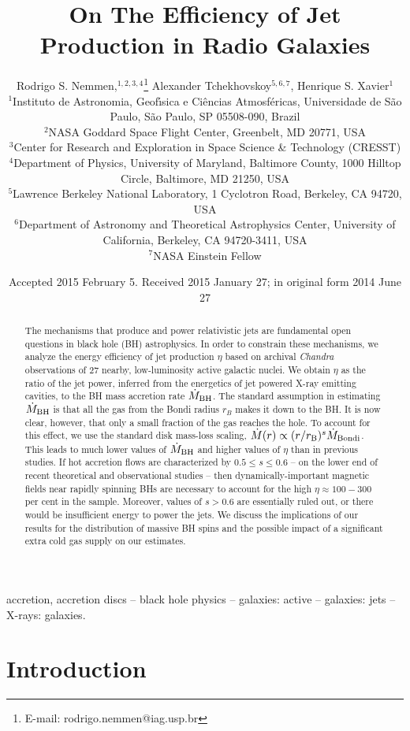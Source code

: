 \documentclass[useAMS,usenatbib]{mn2e}
\title[On the Efficiency of Jet Production in AGNs]{On The Efficiency of Jet Production in Radio Galaxies}
\author[Nemmen]{Rodrigo S. Nemmen,$^{1,2,3,4}$\thanks{E-mail: rodrigo.nemmen@iag.usp.br} Alexander Tchekhovskoy$^{5,6,7}$, 
  Henrique S. Xavier$^{1}$\\
$^{1}$Instituto de Astronomia, Geof\'{\i}sica e Ci\^encias Atmosf\'ericas, Universidade de S\~ao Paulo, S\~ao Paulo, SP 05508-090, Brazil \\
$^{2}$NASA Goddard Space Flight Center, Greenbelt, MD 20771, USA \\
$^{3}$Center for Research and Exploration in Space Science \& Technology (CRESST) \\
$^{4}$Department of Physics, University of Maryland, Baltimore County, 1000 Hilltop Circle, Baltimore, MD 21250, USA \\
$^5$Lawrence Berkeley National Laboratory, 1 Cyclotron Road, Berkeley, CA 94720, USA \\$^6$Department of Astronomy and Theoretical Astrophysics Center, University of California, Berkeley, CA 94720-3411, USA \\
$^7$NASA Einstein Fellow \\
}
\begin{document}
\date{Accepted 2015 February 5. Received 2015 January 27; in original form 2014 June 27}

\pagerange{\pageref{firstpage}--\pageref{lastpage}} 

\maketitle

\label{firstpage}

\begin{abstract}
The mechanisms that produce and power relativistic jets are fundamental open questions in black hole (BH) astrophysics. In order to constrain these mechanisms, we analyze the energy efficiency of jet production $\eta$ based on archival \emph{Chandra} observations of 27 nearby, low-luminosity active galactic nuclei. We obtain $\eta$ as the ratio of the jet power, inferred from the energetics of jet powered X-ray emitting cavities, to the BH mass accretion rate $\dot{M}_{\rm BH}$. The standard assumption in estimating $\dot{M}_{\rm BH}$ is that all the gas from the Bondi radius $r_B$ makes it down to the BH. It is now clear, however, that only a small fraction of the gas reaches the hole. To account for this effect, 
we use the standard disk mass-loss scaling, $\dot{M}(r) \propto (r/r_{\rm B})^s \dot M_{\rm Bondi}$. 
This leads to much lower values of $\dot M_{\rm BH}$ and higher values of $\eta$ than in previous studies. If hot accretion flows are characterized by $0.5 \leq s \leq 0.6$ -- on the lower end of recent theoretical and observational studies -- then dynamically-important magnetic fields near rapidly spinning BHs are necessary to account for the high $\eta \approx 100-300$ per cent in the sample. Moreover, values of $s>0.6$ are essentially ruled out, or there would be insufficient energy to power the jets. 
We discuss the implications of our results for the distribution of massive BH spins and the possible impact of a significant extra cold gas supply on our estimates.
\end{abstract}


\begin{keywords}
accretion, accretion discs -- black hole physics -- galaxies: active -- galaxies: jets -- X-rays: galaxies.
\end{keywords}





\section{Introduction}
\end{document}
